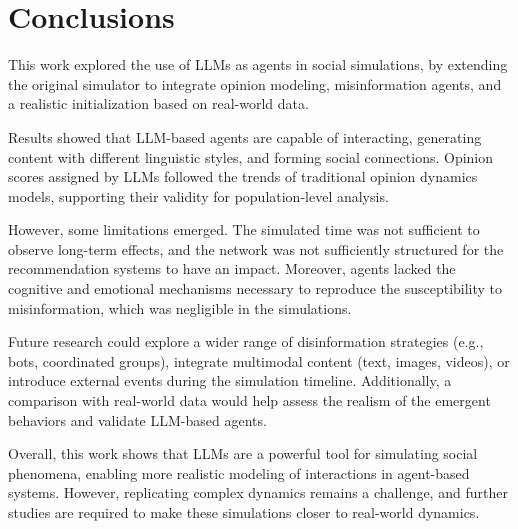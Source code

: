 \section{Conclusions}
\label{sec:conclusion}

This work explored the use of LLMs as agents in social simulations, by extending the original simulator to integrate opinion modeling, misinformation agents, and a realistic initialization based on real-world data.

Results showed that LLM-based agents are capable of interacting, generating content with different linguistic styles, and forming social connections. 
Opinion scores assigned by LLMs followed the trends of traditional opinion dynamics models, supporting their validity for population-level analysis.

However, some limitations emerged.
The simulated time was not sufficient to observe long-term effects, and the network was not sufficiently structured for the recommendation systems to have an impact. 
Moreover, agents lacked the cognitive and emotional mechanisms necessary to reproduce the susceptibility to misinformation, which was negligible in the simulations.

Future research could explore a wider range of disinformation strategies (e.g., bots, coordinated groups), integrate multimodal content (text, images, videos), or introduce external events during the simulation timeline. 
Additionally, a comparison with real-world data would help assess the realism of the emergent behaviors and validate LLM-based agents.

Overall, this work shows that LLMs are a powerful tool for simulating social phenomena, enabling more realistic modeling of interactions in agent-based systems.
However, replicating complex dynamics remains a challenge, and further studies are required to make these simulations closer to real-world dynamics.
